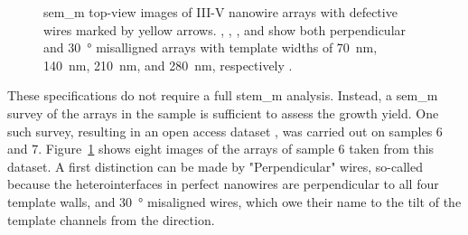 \begin{figure}
{    }
    \caption[\acs{sem_m} images of nanowire arrays.]{\acs{sem_m} top-view images of III-V nanowire arrays with defective wires marked by yellow arrows. , , , and  show both perpendicular and \qty{30}{\degree} misalligned arrays with template widths of \qty{70}{nm}, \qty{140}{nm}, \qty{210}{nm}, and \qty{280}{nm}, respectively \cite{Brugnolotto2023_2}.}
    \label{fig:s7_arrays}
\end{figure}

These specifications do not require a full \acs{stem_m} analysis. Instead, a \acf{sem_m} survey of the arrays in the sample is sufficient to assess the growth yield. One such survey, resulting in an open access dataset \cite{dataset}, was carried out on samples 6 and 7. Figure~\ref{fig:s7_arrays} shows eight images of the arrays of sample 6 taken from this dataset. A first distinction can be made by "Perpendicular" wires, so-called because the heterointerfaces in perfect nanowires are perpendicular to all four template walls, and \qty{30}{\degree} misaligned wires, which owe their name to the tilt of the template channels from the  direction.

